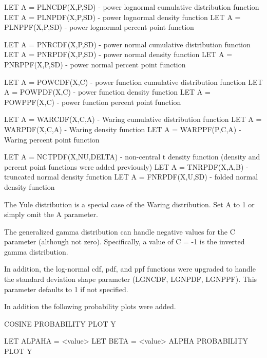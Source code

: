 {      LET A = PLNCDF(X,P,SD)        - power lognormal cumulative
                                      distribution function
      LET A = PLNPDF(X,P,SD)        - power lognormal density function
      LET A = PLNPPF(X,P,SD)        - power lognormal percent point
                                      function

      LET A = PNRCDF(X,P,SD)        - power normal cumulative
                                      distribution function
      LET A = PNRPDF(X,P,SD)        - power normal density function
      LET A = PNRPPF(X,P,SD)        - power normal percent point function

      LET A = POWCDF(X,C)           - power function cumulative
                                      distribution function
      LET A = POWPDF(X,C)           - power function density function
      LET A = POWPPF(X,C)           - power function percent point
                                      function

      LET A = WARCDF(X,C,A)         - Waring cumulative distribution
                                      function
      LET A = WARPDF(X,C,A)         - Waring density function
      LET A = WARPPF(P,C,A)         - Waring percent point function

      LET A = NCTPDF(X,NU,DELTA)    - non-central t density function
                                      (density and percent point
                                      functions were added previously)
      LET A = TNRPDF(X,A,B)         - truncated normal density function
      LET A = FNRPDF(X,U,SD)        - folded normal density function

    The Yule distribution is a special case of the Waring
    distribution.  Set A to 1 or simply omit the A parameter.

    The generalized gamma distribution can handle negative values
    for the C parameter (although not zero).  Specifically, a value
    of C = -1 is the inverted gamma distribution.

    In addition, the log-normal cdf, pdf, and ppf functions were
    upgraded to handle the standard deviation shape parameter (LGNCDF,
    LGNPDF, LGNPPF).  This parameter defaults to 1 if not specified.

    In addition the following probability plots were added.

      COSINE PROBABILITY PLOT Y

      LET ALPAHA = <value>
      LET BETA = <value>
      ALPHA PROBABILITY PLOT Y

}

